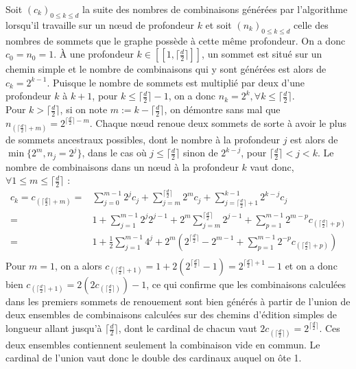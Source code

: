 \documentclass[12pt, twoside]{report}
\begin{document}
Soit $(c_k)_{0 \leq k \leq d}$ la suite des nombres de combinaisons générées par l'algorithme lorsqu'il travaille sur un n\oe{}ud de profondeur $k$ et soit $(n_k)_{0\leq k \leq d}$ celle des nombres de sommets que le graphe possède à cette même profondeur. On a donc $c_0 = n_0 = 1$. À une profondeur $k \in [\![1,\lceil \frac{d}{2}\rceil]\!]$, un sommet est situé sur un chemin simple et le nombre de combinaisons qui y sont générées est alors de $c_k = 2^{k-1}$. Puisque le nombre de sommets est multiplié par deux d'une profondeur $k$ à $k+1$, pour $k \leq \lceil \frac{d}{2}\rceil -1$, on a donc $n_k=2^k, \forall k\leq \lceil \frac{d}{2} \rceil$.\\
Pour $k > \lceil \frac{d}{2} \rceil $, si on note $m:=k-\lceil \frac{d}{2} \rceil$, on démontre sans mal que $n_{(\lceil \frac{d}{2} \rceil + m)} = 2^{\lceil \frac{d}{2}\rceil - m}$. Chaque n\oe{}ud renoue deux sommets de sorte à avoir le plus de sommets ancestraux possibles, dont le nombre à la profondeur $j$ est alors de $\min\{2^{m}, n_j=2^{j}\}$, dans le cas où $j\leq \lceil \frac{d}{2} \rceil$ sinon de $2^{k-j}$, pour $\lceil \frac{d}{2} \rceil < j <k$.
Le nombre de combinaisons dans un n\oe{}ud à la profondeur $k$ vaut donc, $\forall 1 \leq m \leq \lceil \frac{d}{2} \rceil$ :
\begin{equation} \label{eq:def_combis_2}
    \begin{split}
        c_k = c_{(\lceil \frac{d}{2} \rceil + m)} = & \sum_{j=0}^{m-1} 2^j c_j + \sum_{j=m}^{\lceil \frac{d}{2} \rceil} 2^m c_j + \sum_{j=\lceil \frac{d}{2} \rceil+1}^{k-1}2^{k-j}c_j \\
        = & 1 + \sum_{j=1}^{m-1} 2^j 2^{j-1} + 2^m\sum_{j=m}^{\lceil \frac{d}{2} \rceil} 2^{j-1} + \sum_{p=1}^{m-1} 2^{m-p}c_{(\lceil \frac{d}{2} \rceil + p)}\\
        = & 1 + \frac{1}{2}\sum_{j=1}^{m-1} 4^{j} + 2^m\left(2^{\lceil \frac{d}{2} \rceil} -2^{m-1} + \sum_{p=1}^{m-1} 2^{-p}c_{(\lceil \frac{d}{2} \rceil + p)}\right)\\
    \end{split}
\end{equation}
Pour $m=1$, on a alors $c_{(\lceil \frac{d}{2} \rceil + 1)} = 1 +2\left(2^{\lceil \frac{d}{2} \rceil} - 1\right) = 2^{\lceil \frac{d}{2} \rceil+1}-1$ et on a donc bien ${c_{(\lceil \frac{d}{2} \rceil + 1)} = 2(2c_{(\lceil \frac{d}{2} \rceil)})-1}$, ce qui confirme que les combinaisons calculées dans les premiers sommets de renouement sont bien générés à partir de l'union de deux ensembles de combinaisons calculées sur des chemins d'édition simples de longueur allant jusqu'à $\lceil \frac{d}{2} \rceil$, dont le cardinal de chacun vaut $2c_{(\lceil \frac{d}{2} \rceil)} = 2^{\lceil \frac{d}{2} \rceil}$. Ces deux ensembles contiennent seulement la combinaison vide en commun. Le cardinal de l'union vaut donc le double des cardinaux auquel on ôte 1.\\
\end{document}

